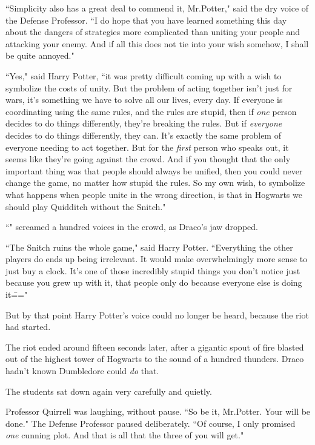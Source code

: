 ``Simplicity also has a great deal to commend it, Mr.\?Potter," said the dry voice of the Defense Professor. ``I do hope that you have learned something this day about the dangers of strategies more complicated than uniting your people and attacking your enemy. And if all this does not tie into your wish somehow, I shall be quite annoyed."

``Yes," said Harry Potter, ``it was pretty difficult coming up with a wish to symbolize the costs of unity. But the problem of acting together isn't just for wars, it's something we have to solve all our lives, every day. If everyone is coordinating using the same rules, and the rules are stupid, then if \emph{one} person decides to do things differently, they're breaking the rules. But if \emph{everyone} decides to do things differently, they can. It's exactly the same problem of everyone needing to act together. But for the \emph{first} person who speaks out, it seems like they're going against the crowd. And if you thought that the only important thing was that people should always be unified, then you could never change the game, no matter how stupid the rules. So my own wish, to symbolize what happens when people unite in the wrong direction, is that in Hogwarts we should play Quidditch without the Snitch."

``" screamed a hundred voices in the crowd, as Draco's jaw dropped.

``The Snitch ruins the whole game," said Harry Potter. ``Everything the other players do ends up being irrelevant. It would make overwhelmingly more sense to just buy a clock. It's one of those incredibly stupid things you don't notice just because you grew up with it, that people only do because everyone else is doing it\==="

But by that point Harry Potter's voice could no longer be heard, because the riot had started.

\later

The riot ended around fifteen seconds later, after a gigantic spout of fire blasted out of the highest tower of Hogwarts to the sound of a hundred thunders. Draco hadn't known Dumbledore could \emph{do} that.

The students sat down again very carefully and quietly.

Professor Quirrell was laughing, without pause. ``So be it, Mr.\?Potter. Your will be done." The Defense Professor paused deliberately. ``Of course, I only promised \emph{one} cunning plot. And that is all that the three of you will get."

